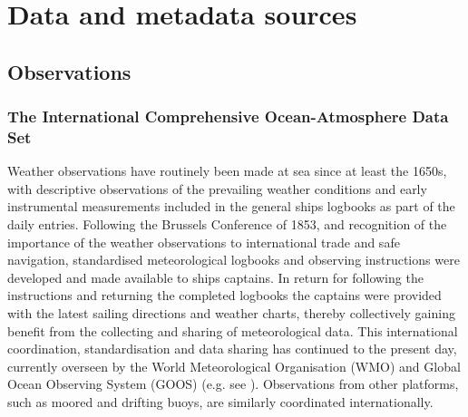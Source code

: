 \section{Data and metadata sources}\label{data_sources}
\subsection{Observations}
\subsubsection{The International Comprehensive Ocean-Atmosphere Data Set}
Weather observations have routinely been made at sea since at least the 1650s, with descriptive observations of the prevailing weather conditions and early instrumental measurements included in the general ships logbooks as part of the daily entries. 
Following the Brussels Conference of 1853, and recognition of the importance of the weather observations to international trade and safe navigation, standardised meteorological logbooks and observing instructions were developed and made available to ships captains.
In return for following the instructions and returning the completed logbooks the captains were provided with the latest sailing directions and weather charts, thereby collectively gaining benefit from the collecting and sharing of meteorological data.
This international coordination, standardisation and data sharing has continued to the present day, currently overseen by the World Meteorological Organisation (WMO) and Global Ocean Observing System (GOOS) (e.g. see \cite{Smith2019}). Observations from other platforms, such as moored and drifting buoys, are similarly coordinated internationally.

